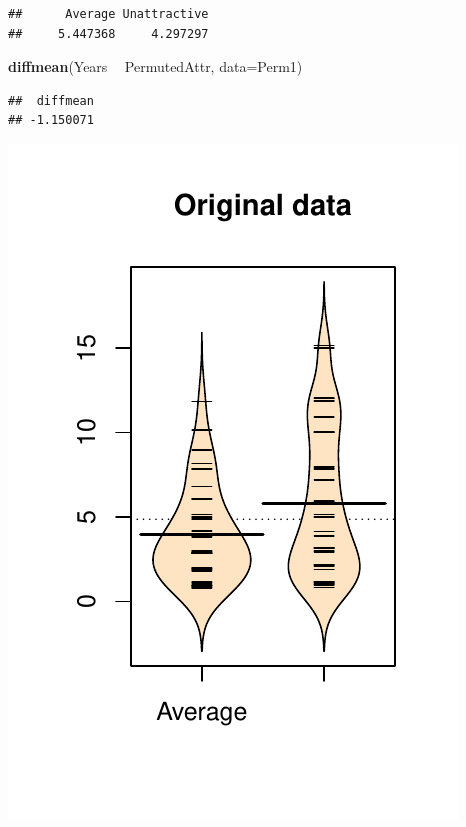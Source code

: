 \documentclass[]{book}
\newenvironment{Shaded}{\begin{snugshade}}{\end{snugshade}}
\newcommand{\KeywordTok}[1]{\textcolor[rgb]{0.13,0.29,0.53}{\textbf{#1}}}
\newcommand{\DataTypeTok}[1]{\textcolor[rgb]{0.13,0.29,0.53}{#1}}
\newcommand{\StringTok}[1]{\textcolor[rgb]{0.31,0.60,0.02}{#1}}
\newcommand{\OperatorTok}[1]{\textcolor[rgb]{0.81,0.36,0.00}{\textbf{#1}}}
\newcommand{\NormalTok}[1]{#1}
\begin{document}
\begin{verbatim}
##      Average Unattractive 
##     5.447368     4.297297
\end{verbatim}

\begin{Shaded}
\begin{Highlighting}[]
\KeywordTok{diffmean}\NormalTok{(Years }\OperatorTok{~}\StringTok{ }\NormalTok{PermutedAttr, }\DataTypeTok{data=}\NormalTok{Perm1)}
\end{Highlighting}
\end{Shaded}

\begin{verbatim}
##  diffmean 
## -1.150071
\end{verbatim}




\includegraphics{GreenwoodBanner_files/figure-latex/Figure2-8-1.pdf}
\end{document}
